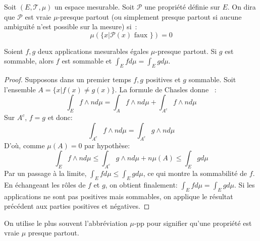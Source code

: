 \begin{defn}
Soit $(E, \mathcal{T}, \mu)$ un espace mesurable. Soit $\mathcal{P}$
une propriété définie sur $E$. On dira que $\mathcal{P}$ est vraie
$\mu$-presque partout (ou simplement presque partout si aucune
ambiguïté n'est possible sur la mesure) si~:
\[
\mu \left (
\{
x | \mathcal{P}(x) \mbox{ faux }
\}
\right ) = 0
\]
\end{defn}
\begin{mandatory}
\begin{prop}\label{ch2:upp}
Soient $f,g$ deux applications mesurables égales $\mu$-presque
partout. Si $g$ est sommable, alors $f$ est sommable et $\int_E f d
\mu = \int_E g d \mu$. 
\end{prop}
\end{mandatory}
\begin{proof}
Supposons dans un premier temps $f,g$ positives et $g$ sommable. 
Soit l'ensemble $A =
\{ x | f(x) \neq g(x) \}$.
La formule de Chasles donne ~:
\[
\int_E f\wedge n  d \mu = \int_A f\wedge n d \mu + \int_{A^c} f \wedge n d \mu
\]
Sur $A^c$, $f=g$ et donc:
\[
\int_{A^c} f \wedge n d \mu = \int_{A^c} g \wedge n d \mu
\]
D'où, comme $\mu(A)=0$ par hypothèse:
\[
\int_E f\wedge n  d \mu \leq \int_{A^c} g \wedge n d \mu + n \mu(A)\leq
\int_{E} g d \mu
\]
Par un passage à la limite, 
$\int_E f d\mu \leq \int_E g d \mu$, ce qui montre la sommabilité de $f$.
En échangeant les rôles de $f$ et $g$, on obtient finalement: $\int_E f d \mu =
\int_E g d \mu$. Si les applications ne sont pas positives mais sommables, on
applique le résultat précédent aux parties positives et négatives. 
\end{proof}
On utilise le plus souvent l'abbréviation $\mu\text{-pp}$ pour signifier qu'une
propriété est vraie $\mu$ presque partout.
